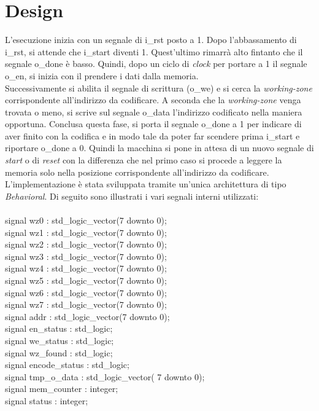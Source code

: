 \documentclass{article}
\begin{document}
\section{Design}
L'esecuzione inizia con un segnale di {\selectfont i\_rst} posto a 1. Dopo l'abbassamento di {\selectfont i\_rst}, si attende che {\selectfont i\_start} diventi 1. Quest'ultimo rimarrà alto fintanto che il segnale {\selectfont o\_done} è basso. Quindi, dopo un ciclo di \textit{clock} per portare a 1 il segnale {\selectfont o\_en}, si inizia con il prendere i dati dalla memoria.\\Successivamente si abilita il segnale di scrittura ({\selectfont o\_we}) e si cerca la \textit{working-zone} corrispondente all'indirizzo da codificare. A seconda che la \textit{working-zone} venga trovata o meno, si scrive sul segnale {\selectfont o\_data} l'indirizzo codificato nella maniera opportuna. Conclusa questa fase, si porta il segnale {\selectfont o\_done} a 1 per indicare di aver finito con la codifica e in modo tale da poter far scendere prima {\selectfont i\_start} e riportare {\selectfont o\_done} a 0. Quindi la macchina si pone in attesa di un nuovo segnale di \textit{start} o di \textit{reset} con la differenza che nel primo caso si procede a leggere la memoria solo nella posizione corrispondente all'indirizzo da codificare.\\
L'implementazione è stata sviluppata tramite un'unica architettura di tipo \textit{Behavioral}. Di seguito sono illustrati i vari segnali interni utilizzati:\\\\
{\selectfont
signal wz0 : std\_logic\_vector(7 downto 0);\\
signal wz1 : std\_logic\_vector(7 downto 0);\\
signal wz2 : std\_logic\_vector(7 downto 0);\\
signal wz3 : std\_logic\_vector(7 downto 0);\\
signal wz4 : std\_logic\_vector(7 downto 0);\\
signal wz5 : std\_logic\_vector(7 downto 0);\\
signal wz6 : std\_logic\_vector(7 downto 0);\\
signal wz7 : std\_logic\_vector(7 downto 0);\\
signal addr : std\_logic\_vector(7 downto 0);\\
signal en\_status : std\_logic;\\
signal we\_status : std\_logic;\\
signal wz\_found : std\_logic;\\
signal encode\_status : std\_logic;\\
signal tmp\_o\_data : std\_logic\_vector( 7 downto 0);\\
signal mem\_counter : integer;\\
signal status : integer;\\
}
\end{document}
